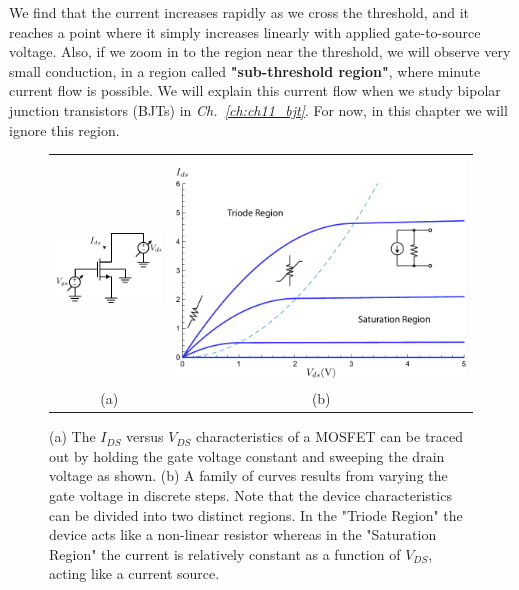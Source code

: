 We find that the current increases rapidly as we cross the threshold, and it reaches a point where it simply increases linearly with applied gate-to-source voltage.  Also, if we zoom in to the region near the threshold, we will observe very small conduction, in a region called \textbf{"sub-threshold region"}, where minute current flow is possible.  We will explain this current flow when we study bipolar junction transistors (BJTs) in \emph{Ch.~\ref{ch:ch11_bjt}}. For now, in this chapter we will ignore this region.
\newpage
\begin{figure}[t]
\centering
\begin{tabular}{cc}
\includegraphics[width=.4\columnwidth]{idvds_sweep} &
\includegraphics[width=.55\columnwidth]{ids_vds}\\
(a) & (b)\\
\end{tabular}
\caption{(a) The $I_{DS}$ versus $V_{DS}$ characteristics of a MOSFET can be traced out by holding the gate voltage constant and sweeping the drain voltage as shown.  (b) A family of curves results from varying the gate voltage in discrete steps.  Note that the device characteristics can be divided into two distinct regions.  In the "Triode Region" the device acts like a non-linear resistor whereas in the "Saturation Region" the current is relatively constant as a function of $V_{DS}$, acting like a current source.}
\label{fig:ids_vds}
\end{figure}
